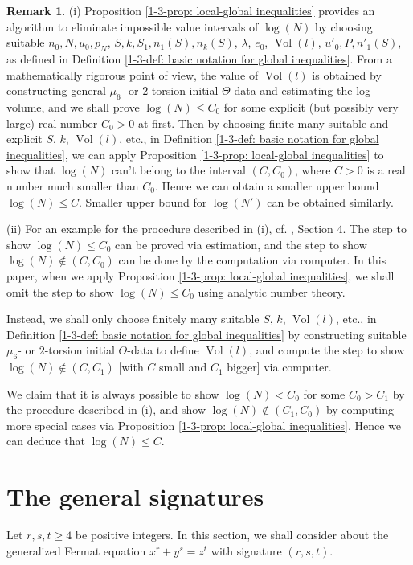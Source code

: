 \documentclass[a4paper, 12pt]{article}
\DeclareMathOperator{\Vol}{\text{Vol}}
\numberwithin{equation}{section}
\theoremstyle{definition}
\newtheorem{tiny-remark}{Remark}[thm]
\begin{document}
\begin{tiny-remark} \label{1-3-rmk:  local-global inequalities}
(i) Proposition \ref{1-3-prop: local-global inequalities} provides an algorithm to eliminate impossible value intervals of $\log(N)$ by choosing suitable $n_0, N, u_0, p_N$, $S, k, S_1, n_1(S), n_k(S)$, $\lambda$, $e_0$, $\Vol(l)$, $u'_0, P, n'_1(S)$, as defined in Definition \ref{1-3-def: basic notation for global inequalities}.
From a mathematically rigorous point of view, the value of $\Vol(l)$ is obtained by constructing general $\mu_6$- or $2$-torsion initial $\Theta$-data and estimating the log-volume, and we shall prove $\log(N) \le C_0$ for some explicit (but possibly very large) real number $C_0 > 0$ at first.
Then by choosing finite many suitable and explicit $S$, $k$, $\Vol(l)$, etc.,  in Definition \ref{1-3-def: basic notation for global inequalities}, we can apply Proposition \ref{1-3-prop: local-global inequalities} to show that $\log(N)$ can't belong to the interval $(C, C_0)$, where $C>0$ is a  real number much smaller than $C_0$. Hence we can obtain a smaller upper bound $\log(N) \le C$. Smaller upper bound for $\log(N')$ can be obtained similarly.

(ii)  For an example for the procedure described in (i), cf. \cite{Diophantine_after_IUT_I}, Section 4. The step to show $\log(N) \le C_0$ can be proved via estimation, and the step to show $\log(N) \notin (C,C_0)$ can be done by the computation via computer. 
In this paper, when we apply Proposition \ref{1-3-prop: local-global inequalities}, we shall omit the step to show $\log(N) \le C_0$ using analytic number theory.

Instead, we shall only choose finitely many suitable $S$, $k$, $\Vol(l)$, etc., in Definition \ref{1-3-def: basic notation for global inequalities} by constructing suitable $\mu_6$- or $2$-torsion initial $\Theta$-data to define $\Vol(l)$, and compute the step to show $\log(N) \notin (C,C_1)$ [with $C$ small and $C_1$ bigger] via computer. 

We claim that it is always possible to show $\log(N) < C_0$ for some $C_0 > C_1$ by the procedure described in (i), 
and show $\log(N) \notin (C_1, C_0)$ by computing more special cases via Proposition \ref{1-3-prop: local-global inequalities}. Hence we can deduce that $\log(N) \le C$.
\end{tiny-remark}


\section{The general signatures}
Let $r,s,t \ge 4$ be positive integers. In this section, we shall consider about the generalized Fermat equation $x^r+y^s=z^t$ with signature $(r,s,t)$. 
\end{document}
